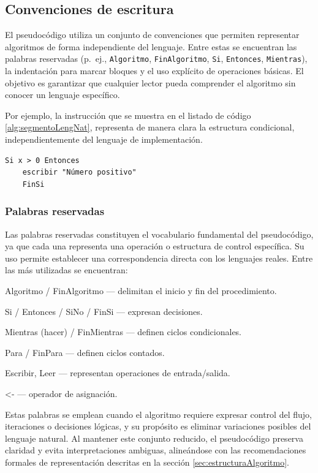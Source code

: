 \documentclass[12pt,twoside]{book}
\begin{document}
				\subsection{Convenciones de escritura}
					\noindent
					El pseudocódigo utiliza un conjunto de convenciones que permiten representar algoritmos de forma independiente del lenguaje. Entre estas se encuentran las palabras reservadas (p.~ej., \texttt{Algoritmo}, \texttt{FinAlgoritmo}, \texttt{Si}, \texttt{Entonces}, \texttt{Mientras}), la indentación para marcar bloques y el uso explícito de operaciones básicas. El objetivo es garantizar que cualquier lector pueda comprender el algoritmo sin conocer un lenguaje específico.
					
					Por ejemplo, la instrucción que se muestra en el listado de código \ref{alg:segmentoLengNat}, representa de manera clara la estructura condicional, independientemente del lenguaje de implementación.
				
					\begin{lstlisting}[language={},caption={Estructura de Selección/Condicional como Parte de un Algoritmo},label={alg:segmentoLengNat}]
	Si x > 0 Entonces
	escribir "Número positivo"
	FinSi \end{lstlisting}
				
					\subsubsection{Palabras reservadas}
						\noindent
						Las palabras reservadas constituyen el vocabulario fundamental del pseudocódigo, ya que cada una representa una operación o estructura de control específica. Su uso permite establecer una correspondencia directa con los lenguajes reales. Entre las más utilizadas se encuentran:
						
						Algoritmo / FinAlgoritmo — delimitan el inicio y fin del procedimiento.
						
						Si / Entonces / SiNo / FinSi — expresan decisiones.
						
						Mientras (hacer) / FinMientras — definen ciclos condicionales.
						
						Para / FinPara — definen ciclos contados.
						
						Escribir, Leer — representan operaciones de entrada/salida.
						
						<- — operador de asignación.
						
						\noindent
						Estas palabras se emplean cuando el algoritmo requiere expresar control del flujo, iteraciones o decisiones lógicas, y su propósito es eliminar variaciones posibles del lenguaje natural. Al mantener este conjunto reducido, el pseudocódigo preserva claridad y evita interpretaciones ambiguas, alineándose con las recomendaciones formales de representación descritas en la sección \ref{sec:estructuraAlgoritmo}.
				
\end{document}
